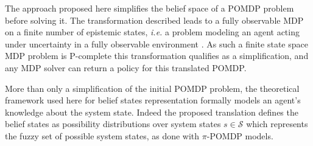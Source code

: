 The approach proposed here simplifies the belief space of a POMDP problem before solving it.
The transformation described leads to a fully observable MDP on a finite
number of epistemic states, \textit{i.e.} a problem 
modeling an agent acting under uncertainty in a fully
observable environment \cite{puterman94}. As such a finite state space 
MDP problem is P-complete \cite{Papadimitriou:1987} 
this transformation qualifies as a simplification, and any MDP solver 
can return a policy for this translated POMDP.



More than only a simplification of the initial POMDP problem,
the theoretical framework used here for belief states representation
formally models an agent's knowledge about the system state.
Indeed the proposed translation defines the belief states as possibility distributions
over system states $s \in \mathcal{S}$
which represents the fuzzy set of possible system states, 
as done with $\pi$-POMDP models.



